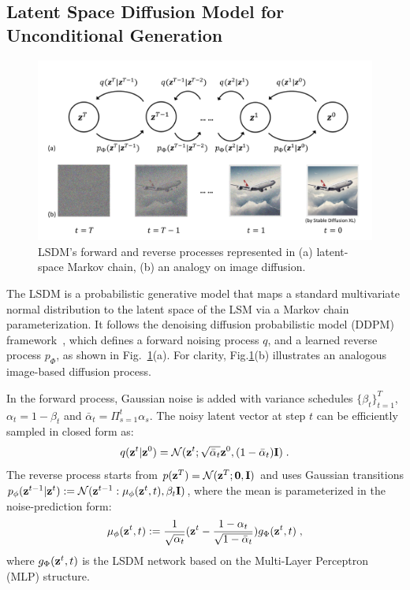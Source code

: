 \subsection{Latent Space Diffusion Model for Unconditional Generation}

\begin{figure}[!t]
    \begin{center}
        \includegraphics[width=0.95\linewidth]{chapter6/fig/ddpm.pdf}
    \end{center}
    \vspace{-4mm}
    \caption{
        \small LSDM's forward and reverse processes represented in (a) latent-space Markov chain, (b) an analogy on image diffusion.
    }
    \label{ch6:fig:abs_ddpm}
\end{figure}

The LSDM is a probabilistic generative model that maps a standard multivariate normal distribution to the latent space of the LSM via a Markov chain parameterization. It follows the denoising diffusion probabilistic model (DDPM) framework~\cite{ai.Ho2020}, which defines a forward noising process $q$, and a learned reverse process $p_\Phi$, as shown in Fig.~\ref{ch6:fig:abs_ddpm}(a). For clarity, Fig.\ref{ch6:fig:abs_ddpm}(b) illustrates an analogous image-based diffusion process.

In the forward process, Gaussian noise is added with variance schedules $\{\beta_t\}^T_{t=1}$, $\alpha_t=1-\beta_t$ and $\bar{\alpha}_t=\Pi^t_{s=1}\alpha_s$. The noisy latent vector at step $t$ can be efficiently sampled in closed form as:
\begin{equation}
    q(\mathbf{z}^t | \mathbf{z}^0) = \mathcal{N}(\mathbf{z}^t; \sqrt{\Bar{\alpha}_t} \mathbf{z}^0, (1-\Bar{\alpha}_t) \mathbf{I})\;.
\end{equation}
The reverse process starts from $p(\mathbf{z}^T)=\mathcal{N}(\mathbf{z}^T; \textbf{0}, \mathbf{I})$ and uses Gaussian transitions $p_\phi(\mathbf{z}^{t-1} | \mathbf{z}^t) := \mathcal{N}(\mathbf{z}^{t-1}: \mathbf{\mu}_\phi(\mathbf{z}^t, t), \beta_t \mathbf{I})$, where the mean is parameterized in the noise-prediction form:
\begin{equation}
    \mathbf{\mu}_\phi(\mathbf{z}^t, t) := \frac{1}{\sqrt{\alpha_t}} (\mathbf{z}^t - \frac{1-\alpha_t}{\sqrt{1-\Bar{\alpha}_t}}) g_\Phi(\mathbf{z}^t, t)\;,
\end{equation}
where $g_\Phi(\mathbf{z}^t, t)$ is the LSDM network based on the Multi-Layer Perceptron (MLP) structure.

